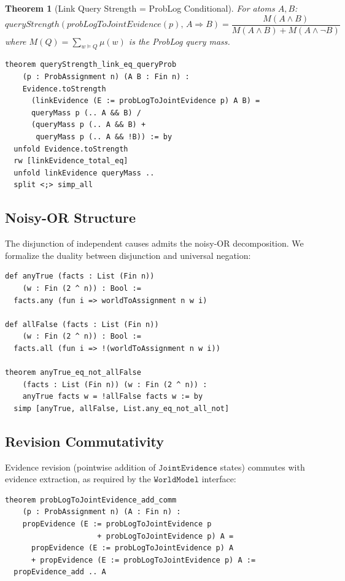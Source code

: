 \documentclass[]{article}
\newtheorem{theorem}{Theorem}
\newcommand{\ty}[1]{\ensuremath{\mathtt{#1}}}
\newcommand{\JointEvidence}{\ty{JointEvidence}}
\newcommand{\WorldModel}{\ty{WorldModel}}
\begin{document}
\begin{theorem}[Link Query Strength = ProbLog Conditional]
\label{thm:link}
For atoms $A, B$:
\[
  \mathit{queryStrength}(\mathit{probLogToJointEvidence}(p),\, A \Rightarrow B)
  = \frac{M(A \wedge B)}{M(A \wedge B) + M(A \wedge \neg B)}
\]
where $M(Q) = \sum_{w \models Q} \mu(w)$ is the ProbLog query mass.
\end{theorem}

\begin{lstlisting}[caption={Link correspondence (Lean~4)},label=lst:link-thm]
theorem queryStrength_link_eq_queryProb
    (p : ProbAssignment n) (A B : Fin n) :
    Evidence.toStrength
      (linkEvidence (E := probLogToJointEvidence p) A B) =
      queryMass p (.. A && B) /
      (queryMass p (.. A && B) +
       queryMass p (.. A && !B)) := by
  unfold Evidence.toStrength
  rw [linkEvidence_total_eq]
  unfold linkEvidence queryMass ..
  split <;> simp_all
\end{lstlisting}

\subsection{Noisy-OR Structure}

The disjunction of independent causes admits the noisy-OR decomposition.
We formalize the duality between disjunction and universal negation:

\begin{lstlisting}[caption={Noisy-OR duality (Lean~4)},label=lst:noisy-or]
def anyTrue (facts : List (Fin n))
    (w : Fin (2 ^ n)) : Bool :=
  facts.any (fun i => worldToAssignment n w i)

def allFalse (facts : List (Fin n))
    (w : Fin (2 ^ n)) : Bool :=
  facts.all (fun i => !(worldToAssignment n w i))

theorem anyTrue_eq_not_allFalse
    (facts : List (Fin n)) (w : Fin (2 ^ n)) :
    anyTrue facts w = !allFalse facts w := by
  simp [anyTrue, allFalse, List.any_eq_not_all_not]
\end{lstlisting}

\subsection{Revision Commutativity}

Evidence revision (pointwise addition of \JointEvidence{} states) commutes with
evidence extraction, as required by the \WorldModel{} interface:

\begin{lstlisting}[caption={Revision commutes with extraction},label=lst:revision]
theorem probLogToJointEvidence_add_comm
    (p : ProbAssignment n) (A : Fin n) :
    propEvidence (E := probLogToJointEvidence p
                     + probLogToJointEvidence p) A =
      propEvidence (E := probLogToJointEvidence p) A
      + propEvidence (E := probLogToJointEvidence p) A :=
  propEvidence_add .. A
\end{lstlisting}
\end{document}
